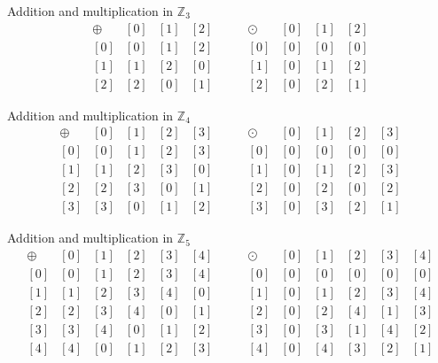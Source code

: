 \documentclass[letterpaper,12pt]{article}
\newcommand{\Z}{\mathbb{Z}}
\begin{document}
\begin{center}
 Addition and multiplication in $\Z_3$
\[
 \begin{array}{c|ccc}
  \oplus & [0] & [1] & [2]\\
\hline
{[0]}& [0] & [1] & [2]\\
{[1]}& [1] & [2] & [0]\\
{[2]}& [2] & [0] & [1]
 \end{array} \quad \quad
 \begin{array}{c|ccc}
  \odot & [0] & [1] & [2]\\
\hline
{[0]}& [0] & [0] & [0]\\
{[1]}& [0] & [1] & [2]\\
{[2]}& [0] & [2] & [1]
 \end{array}
\]

\medskip

Addition and multiplication in $\Z_4$
\[
  \begin{array}{c|cccc}
  \oplus & [0] & [1] & [2] & [3]\\
\hline
{[0]}& [0] & [1] & [2] & [3]\\
{[1]}& [1] & [2] & [3] & [0]\\
{[2]}& [2] & [3] & [0] & [1]\\
{[3]}& [3] & [0] & [1] & [2]
 \end{array} \quad \quad
  \begin{array}{c|cccc}
  \odot & [0] & [1] & [2] & [3]\\
\hline
{[0]}& [0] & [0] & [0] & [0]\\
{[1]}& [0] & [1] & [2] & [3]\\
{[2]}& [0] & [2] & [0] & [2]\\
{[3]}& [0] & [3] & [2] & [1]
 \end{array}
\]

\medskip

Addition and multiplication in $\Z_5$
\[
   \begin{array}{c|ccccc}
  \oplus & [0] & [1] & [2] & [3] & [4]\\
\hline
{[0]}& [0] & [1] & [2] & [3] & [4]\\
{[1]}& [1] & [2] & [3] & [4] & [0]\\
{[2]}& [2] & [3] & [4] & [0] & [1]\\
{[3]}& [3] & [4] & [0] & [1] & [2]\\
{[4]}& [4] & [0] & [1] & [2] & [3]
 \end{array} \quad \quad
   \begin{array}{c|ccccc}
  \odot & [0] & [1] & [2] & [3] & [4]\\
\hline
{[0]}& [0] & [0] & [0] & [0] & [0]\\
{[1]}& [0] & [1] & [2] & [3] & [4]\\
{[2]}& [0] & [2] & [4] & [1] & [3]\\
{[3]}& [0] & [3] & [1] & [4] & [2]\\
{[4]}& [0] & [4] & [3] & [2] & [1]
 \end{array}
\]


\end{center}
\end{document}
